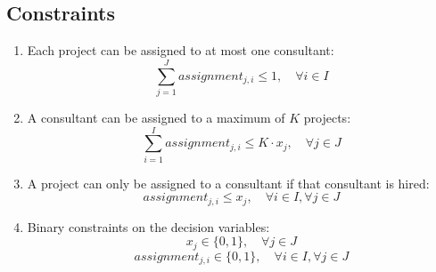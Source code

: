 \documentclass{article}
\begin{document}
\subsection*{Constraints}
\begin{enumerate}
    \item Each project can be assigned to at most one consultant:
    \[
    \sum_{j=1}^{J} assignment_{j,i} \leq 1, \quad \forall i \in I
    \]

    \item A consultant can be assigned to a maximum of \( K \) projects:
    \[
    \sum_{i=1}^{I} assignment_{j,i} \leq K \cdot x_j, \quad \forall j \in J
    \]

    \item A project can only be assigned to a consultant if that consultant is hired:
    \[
    assignment_{j,i} \leq x_j, \quad \forall i \in I, \forall j \in J
    \]

    \item Binary constraints on the decision variables:
    \[
    x_j \in \{0, 1\}, \quad \forall j \in J
    \]
    \[
    assignment_{j,i} \in \{0, 1\}, \quad \forall i \in I, \forall j \in J
    \]
\end{enumerate}
\end{document}
